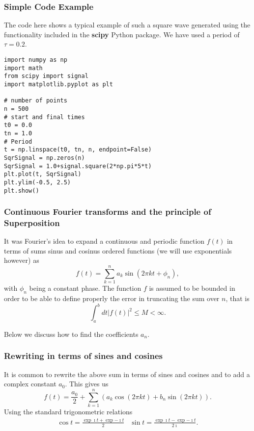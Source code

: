 \documentclass{beamer}
\begin{document}
\begin{frame}
\frametitle{Simple Code Example}

The code here shows a typical example of such a square wave generated
using the functionality included in the \textbf{scipy} Python package. We
have used a period of $\tau=0.2$.



















\begin{verbatim}
import numpy as np
import math
from scipy import signal
import matplotlib.pyplot as plt

# number of points                                                                                       
n = 500
# start and final times                                                                                  
t0 = 0.0
tn = 1.0
# Period                                                                                                 
t = np.linspace(t0, tn, n, endpoint=False)
SqrSignal = np.zeros(n)
SqrSignal = 1.0+signal.square(2*np.pi*5*t)
plt.plot(t, SqrSignal)
plt.ylim(-0.5, 2.5)
plt.show()

\end{verbatim}
\end{frame}

\begin{frame}
\frametitle{Continuous Fourier transforms and the principle of Superposition}

It was Fourier's idea to expand a continuous and periodic function $f(t)$ in terms of sums sinus and cosinus ordered functions (we will use exponentials however)
as
\[
f(t) = \sum_{k=1}^{n}a_k\sin{(2\pi kt+\phi_n)},
\]
with $\phi_n$ being a constant phase. The function $f$ is assumed to be bounded in order to be able to define properly the error in truncating the sum
over $n$, that is
\[
\int_a^b dt \vert f(t)\vert^2 \le M < \infty.
\]

Below we discuss how to find the coefficients $a_n$.
\end{frame}

\begin{frame}
\frametitle{Rewriting in terms of sines and cosines}

It is common to rewrite the above sum in terms of sines and cosines and to add a complex constant $a_0$. This gives us
\[
f(t) = \frac{a_0}{2}+ \sum_{k=1}^{n}\left(a_k\cos{(2\pi kt)}+b_n\sin{(2\pi kt)}\right).
\]
Using the standard trigonometric relations
\begin{align*}
\cos{t} = \frac{\exp{\imath t}+\exp{-\imath t}}{2} & \sin{t} = \frac{\exp{\imath t}-\exp{-\imath t}}{2\imath}.
\end{align*}
\end{frame}
\end{document}
